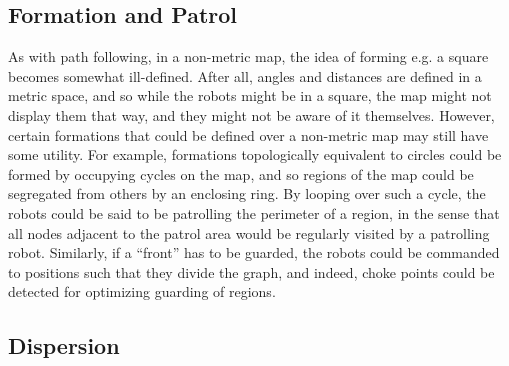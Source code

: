 \subsection{Formation and Patrol}

As with path following, in a non-metric map, the idea of forming e.g. a square becomes somewhat ill-defined. 
After all, angles and distances are defined in a metric space, and so while the robots might be in a square, the map might not display them that way, and they might not be aware of it themselves. 
However, certain formations that could be defined over a non-metric map may still have some utility. 
For example, formations topologically equivalent to circles could be formed by occupying cycles on the map, and so regions of the map could be segregated from others by an enclosing ring. 
By looping over such a cycle, the robots could be said to be patrolling the perimeter of a region, in the sense that all nodes adjacent to the patrol area would be regularly visited by a patrolling robot. Similarly, if a ``front'' has to be guarded, the robots could be commanded to positions such that they divide the graph, and indeed, choke points could be detected for optimizing guarding of regions.

\subsection{Dispersion}

